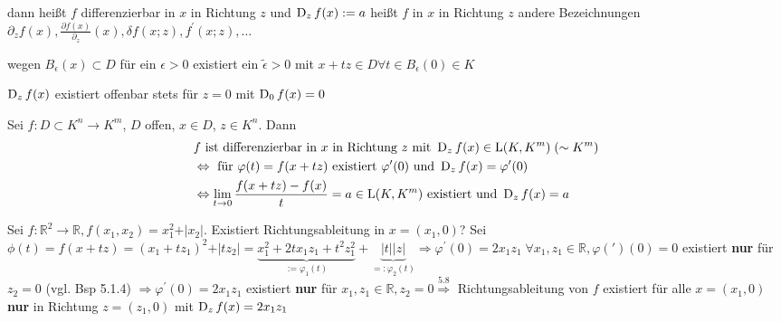 dann heißt $f$ differenzierbar in $x$ in Richtung $z$ und $\operatorname{D}_z f(x):= a$ heißt  $f$ in $x$ in Richtung $z$ andere Bezeichnungen $\partial_z f(x), \frac{\partial f(x)}{\partial_z}(x), \delta f(x;z), f^{'}(x;z), \dots$

\begin{bemerkung}
    \begin{compactitem}
        \item wegen $B_{\epsilon}(x) \subset D$ für ein $\epsilon > 0$ existiert ein $\tilde{\epsilon} > 0$ mit $x+tz \in D \forall t \in B_{\epsilon}(0) \in K$
        \item $\operatorname{D}_z f(x)$ existiert offenbar stets für $z=0$ mit $\operatorname{D}_0 f(x) = 0$
    \end{compactitem}
\end{bemerkung}

\begin{folgerung}{\label{folg:äquiv_richtungsableit}}
    Sei $f: D \subset K^n \to K^m$, $D$ offen, $x\in D$, $z \in K^n$. Dann
    \begin{align} %
    &f \text{ ist differenzierbar in } x \text{ in Richtung } z \text{ mit } \Diff_z f(x) \in \LinAbb(K, K^m)\;(\sim K^m)\\
    &\Leftrightarrow \text{ für } \varphi(t) = f(x + tz) \text{ existiert } \varphi^{\prime}(0) \text{ und } \Diff_z f(x) = \varphi^{\prime}(0)\\
    &\Leftrightarrow \lim_{t \to 0} \frac{f(x + tz) - f(x)}{t} = a \in \LinAbb(K,K^m) \text{ existiert und } \Diff_z f(x) = a
    \end{align}
\end{folgerung}

\begin{beispiel}
    Sei $f: \mathbb{R}^2 \to \mathbb{R}, f(x_1,x_2) = x_1^2 + \vert x_2\vert$. Existiert Richtungsableitung in $x=(x_1,0)$? Sei $\phi(t) = f(x + tz) = (x_1 + tz_1)^2 + \vert tz_2\vert = \underbrace{x_1^2 + 2tx_1 z_1 +  t^2 z_1^2}_{:= \varphi_1(t)} + \underbrace{\vert t \vert \vert z \vert}_{=: \varphi_2(t)} \Rightarrow \varphi^{\prime}(0) = 2x_1z_1\;\forall x_1, z_1 \in \mathbb{R}, \varphi(\prime)(0) = 0$ existiert \textbf{nur} für $z_2 = 0$ (vgl. Bsp 5.1.4) %
    $\Rightarrow \varphi^{\prime}(0) = 2x_1 z_1$ existiert \textbf{nur} für $x_1, z_1 \in \mathbb{R}, z_2 = 0 \overset{5.8}{\Rightarrow}$ Richtungsableitung von $f$ existiert für alle $x=(x_1,0)$ \textbf{nur} in Richtung $z=(z_1,0)$ mit $\operatorname{D}_z f(x) = 2x_1 z_1$
\end{beispiel}

